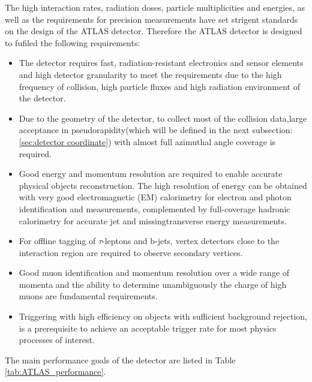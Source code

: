 \documentclass[letterpaper,12pt]{article}
\begin{document}
The high interaction rates, radiation doses, particle 
multiplicities and energies, as well as the
requirements for precision measurements have set strigent
standards on the design of the ATLAS detector. 
Therefore the ATLAS detector is designed to fufiled the following 
requirements:





\begin{itemize}
\item
The detector requires fast, radiation-resistant  
electronics and sensor elements and high detector granularity
to meet the requirements due to the high frequency of collision,
high particle fluxes and high radiation environment of the
detector.


\item
Due to the geometry of the detector, to collect most of the 
collision data,large acceptance in pseudorapidity(which will be defined
in the next subsection: \ref{sec:detector coordinate}) 
with almost full azimuthal angle coverage is required.


\item
Good energy and momentum resolution are required to 
enable accurate physical objects reconstruction. 
The high resolution of energy can be obtained 
with very good electromagnetic (EM) calorimetry for 
electron and photon identification and measurements,
complemented by full-coverage hadronic calorimetry 
for accurate jet and missingtransverse energy measurements.


\item
For offline tagging of $\tau$-leptons and b-jets, vertex 
detectors close to the interaction region are 
required to observe secondary vertices.


\item
Good muon identification and momentum resolution 
over a wide range of momenta and the ability 
to determine unambiguously the charge of high 
\pt muons are fundamental requirements.


\item

Triggering with high efficiency on \pt
objects with sufficient background rejection, is a 
prerequisite to achieve an acceptable trigger rate 
for most physics processes of interest.
\end{itemize}


The main performance goals of the detector are 
listed in Table \ref{tab:ATLAS_performance}. 
\end{document}
